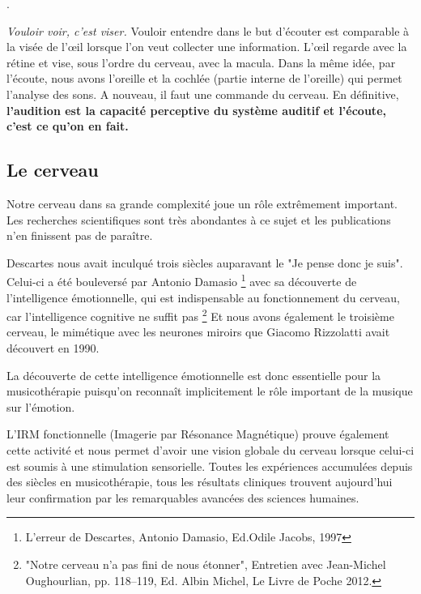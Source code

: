 \autocite{lemonde.fr:stradivarius}.
% 

\autocite[p. 43]{roque:lecoute}

 \emph{Vouloir voir, c'est viser.}  Vouloir entendre dans le but d'écouter est comparable  à
la visée de l'\oe il lorsque l'on veut collecter une information. L'\oe il regarde avec la rétine et  vise, sous l'ordre du cerveau, avec la macula. Dans la même idée, par l'écoute, nous avons l'oreille et la cochlée (partie interne de l'oreille) qui permet l'analyse des sons. A nouveau, il faut une commande du cerveau.
En définitive, \textbf{ l'audition est la capacité perceptive du système auditif et l'écoute, c'est ce qu'on en fait.}

\subsection{Le cerveau}

Notre cerveau  dans sa grande complexité joue un rôle extrêmement important.
Les recherches scientifiques sont très abondantes à ce sujet et les publications n'en finissent pas de paraître.


Descartes nous avait inculqué trois siècles auparavant le "Je pense donc je suis". Celui-ci  a 
été bouleversé par Antonio Damasio \footnote {{L'erreur de Descartes}, Antonio Damasio, 
Ed.Odile Jacobs, 1997} 
avec sa découverte de l'intelligence émotionnelle, qui est indispensable au fonctionnement 
du 
cerveau, car  l'intelligence cognitive ne suffit pas%
\footnote{"Notre cerveau n'a pas fini de nous étonner", Entretien avec Jean-Michel 
     Oughourlian, pp. 118--119, Ed. Albin Michel, Le Livre de Poche 2012.}
Et nous avons  également le troisième cerveau, le mimétique avec les neurones miroirs que Giacomo Rizzolatti avait découvert en 1990.
 
La découverte de cette intelligence  émotionnelle est donc essentielle  pour la 
musicothérapie puisqu'on reconnaît implicitement le rôle important de la musique sur 
l'émotion.  

L'IRM fonctionnelle 
(Imagerie par Résonance Magnétique) prouve également cette activité et nous  permet d'avoir 
une vision 
globale du cerveau lorsque celui-ci est soumis à une stimulation 
sensorielle. Toutes les expériences accumulées depuis des siècles en musicothérapie,
tous les résultats cliniques trouvent aujourd'hui leur confirmation par les remarquables
avancées des sciences humaines. 


